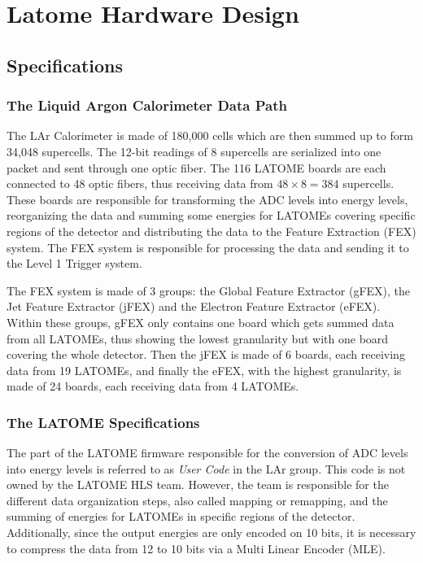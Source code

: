 \chapter{Latome Hardware Design}\label{ch:latome-firmware}

\section{Specifications}\label{sec:specifications}
\subsection{The Liquid Argon Calorimeter Data Path}\label{sec:lar}
The LAr Calorimeter is made of 180,000 cells which are then summed up to form 34,048 supercells. The 12-bit readings of 8 supercells are serialized into one packet and sent through one optic fiber. The 116 LATOME boards are each connected to 48 optic fibers, thus receiving data from \(48\times8=384\) supercells. These boards are responsible for transforming the ADC levels into energy levels, reorganizing the data and summing some energies for LATOMEs covering specific regions of the detector and distributing the data to the Feature Extraction (FEX) system. The FEX system is responsible for processing the data and sending it to the Level 1 Trigger system.

The FEX system is made of 3 groups: the Global Feature Extractor (gFEX), the Jet Feature Extractor (jFEX) and the Electron Feature Extractor (eFEX). Within these groups, gFEX only contains one board which gets summed data from all LATOMEs, thus showing the lowest granularity but with one board covering the whole detector. Then the jFEX is made of 6 boards, each receiving data from 19 LATOMEs, and finally the eFEX, with the highest granularity, is made of 24 boards, each receiving data from 4 LATOMEs.

\subsection{The LATOME Specifications}\label{sec:latome-specifications}
The part of the LATOME firmware responsible for the conversion of ADC levels into energy levels is referred to as \textit{User Code} in the LAr group. This code is not owned by the LATOME HLS team. However, the team is responsible for the different data organization steps, also called mapping or remapping, and the summing of energies for LATOMEs in specific regions of the detector. Additionally, since the output energies are only encoded on 10 bits, it is necessary to compress the data from 12 to 10 bits via a Multi Linear Encoder (MLE).

